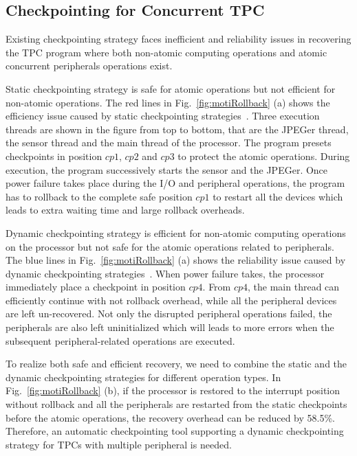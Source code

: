 \subsection{Checkpointing for Concurrent TPC} \label{sec:motiSW}
%
Existing checkpointing strategy faces inefficient and reliability issues in recovering the TPC program where both non-atomic computing operations and atomic concurrent peripherals operations exist.

Static checkpointing strategy is safe for atomic operations but not efficient for non-atomic operations.
The red lines in Fig.~\ref{fig:motiRollback} (a) shows the efficiency issue caused by static checkpointing strategies~\cite{ransford2012mementos,Lucia2015,jayakumar2014quickrecall}.
Three execution threads are shown in the figure from top to bottom, that are the JPEGer thread, the sensor thread and the main thread of the processor.
The program presets checkpoints in position $cp1$, $cp2$ and $cp3$ to protect the atomic operations.
During execution, the program successively starts the sensor and the JPEGer.
Once power failure takes place during the I/O and peripheral operations, the program has to rollback to the complete safe position $cp1$ to restart all the devices which leads to extra waiting time and large rollback overheads.

Dynamic checkpointing strategy is efficient for non-atomic computing operations on the processor but not safe for the atomic operations related to peripherals.
The blue lines in Fig.~\ref{fig:motiRollback} (a) shows the reliability issue caused by dynamic checkpointing strategies~\cite{wang20123us,liu2016a,Liu2015Ambient,balsamo2015hibernus}.
When power failure takes, the processor immediately place a checkpoint in position $cp4$.
From $cp4$, the main thread can efficiently continue with not rollback overhead, while all the peripheral devices are left un-recovered. 
Not only the disrupted peripheral operations failed, the peripherals are also left uninitialized which will leads to more errors when the subsequent peripheral-related operations are executed.

%
To realize both safe and efficient recovery, we need to combine the static and the dynamic checkpointing strategies for different operation types.
In Fig.~\ref{fig:motiRollback} (b), if the processor is restored to the interrupt position without rollback and all the peripherals are restarted from the static checkpoints before the atomic operations, the recovery overhead can be reduced by 58.5\%.
Therefore, an automatic checkpointing tool supporting a dynamic checkpointing strategy for TPCs with multiple peripheral is needed. 

